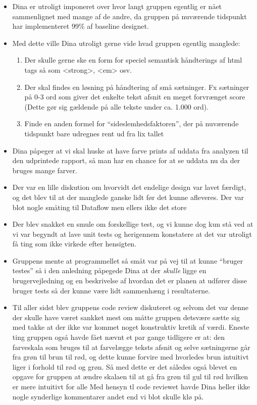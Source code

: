 \begin{itemize}

\item Dina er utroligt imponeret over hvor langt gruppen egentlig er nået sammenlignet med mange af de andre, da gruppen på nuværende tidspunkt har implementeret 99\% af baseline designet.

\item Med dette ville Dina utroligt gerne vide hvad gruppen egentlig manglede:

\begin{enumerate}
 \item Der skulle gerne ske en form for speciel semantisk håndterings af html tags så som <strong>, <em> osv.
\item Der skal findes en løsning på håndtering af små sætninger. Fx sætninger på 0-3 ord som giver det enkelte tekst afsnit en meget forvrænget score (Dette gør sig gældende på alle tekste under ca. 1.000 ord).
\item Finde en anden formel for ``sideslemhedsfaktoren'', der på nuværende tidspunkt bare udregnes rent ud fra lix tallet
\end{enumerate}

\item Dina påpeger at vi skal huske at have farve prints af uddata fra analyzen til den udprintede rapport, så man har en chance for at se uddata nu da der bruges mange farver.

\item Der var en lille diskution om hvorvidt det endelige design var lavet færdigt, og det blev til at der manglede ganske lidt før det kunne afleveres. Der var blot nogle småting til Dataflow men ellers ikke det store

\item Der blev snakket en smule om forskellige test, og vi kunne dog kun stå ved at vi var begyndt at lave unit tests og herigennem konstatere at det var utroligt få ting som ikke virkede efter hensigten.

\item Gruppens mente at programmellet så småt var på vej til at kunne ``bruger testes'' så i den anledning påpegede Dina at der \textit{skulle} ligge en brugervejledning og en beskrivelse af hvordan det er planen at udfører disse bruger tests så der kunne være lidt sammenhæng i resultaterne.

\item Til aller sidst blev gruppens code review diskuteret og selvom det var denne der skulle have været sankket mest om måtte gruppen detsvære sætte sig med takke at der ikke var kommet noget konstruktiv kretik af værdi.
Eneste ting gruppen også havde fået nævnt et par gange tidligere er at: den farveskala som bruges til at farvelægge teksts afsnit og selve sætningerne går fra grøn til brun til rød, og dette kunne forvire med hvorledes brun intuitivt liger i forhold til rød og grøn. Så med dette er det således også blevet en opgave for gruppen at ændre skalaen til at gå fra grøn til gul til rød hvilken er mere intuitivt for alle 
Med hensyn tl code reviewet havde Dina heller ikke nogle synderlige kommentarer andet end vi blot skulle klø på.

\end{itemize}

